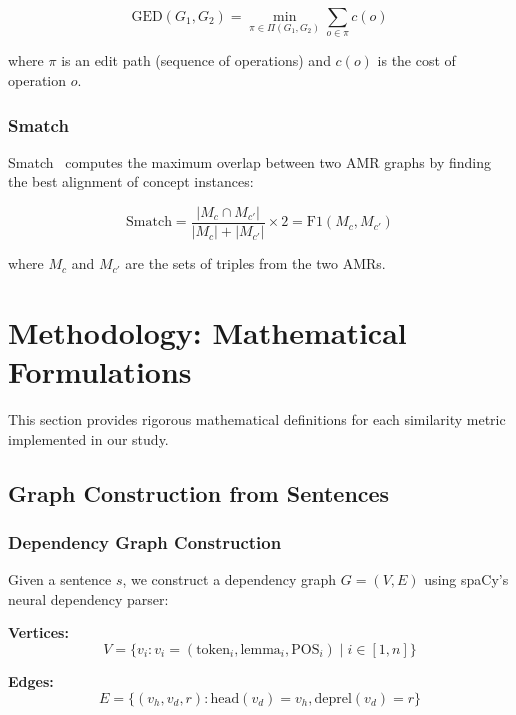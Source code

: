 \documentclass[11pt,a4paper]{article}
\begin{document}
\begin{equation}
\text{GED}(G_1, G_2) = \min_{\pi \in \Pi(G_1, G_2)} \sum_{o \in \pi} c(o)
\end{equation}

where $\pi$ is an edit path (sequence of operations) and $c(o)$ is the cost of operation $o$.

\subsubsection{Smatch}

Smatch~\citep{cai2013smatch} computes the maximum overlap between two AMR graphs by finding the best alignment of concept instances:

\begin{equation}
\text{Smatch} = \frac{|M_c \cap M_{c'}|}{|M_c| + |M_{c'}|} \times 2 = \text{F1}(M_c, M_{c'})
\end{equation}

where $M_c$ and $M_{c'}$ are the sets of triples from the two AMRs.

\section{Methodology: Mathematical Formulations}

This section provides rigorous mathematical definitions for each similarity metric implemented in our study.

\subsection{Graph Construction from Sentences}

\subsubsection{Dependency Graph Construction}

Given a sentence $s$, we construct a dependency graph $G = (V, E)$ using spaCy's neural dependency parser:

\textbf{Vertices:}
\begin{equation}
V = \{v_i : v_i = (\text{token}_i, \text{lemma}_i, \text{POS}_i) \mid i \in [1, n]\}
\end{equation}

\textbf{Edges:}
\begin{equation}
E = \{(v_h, v_d, r) : \text{head}(v_d) = v_h, \text{deprel}(v_d) = r\}
\end{equation}
\end{document}
